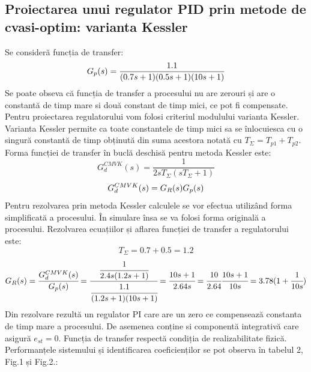 \documentclass[11pt]{article}
\newcommand{\EqRow}{\vspace{1.5mm}}
\begin{document}
\subsection{Proiectarea unui regulator PID prin metode de cvasi-optim: varianta Kessler}
Se consideră funcția de transfer:
\EqRow
\begin{equation}
G_p(s)=\frac{1.1}{(0.7s+1)(0.5s+1)(10s+1)}
\EqRow
\end{equation}
Se poate obseva că funcția de transfer a procesului nu are zerouri și are o  constantă de timp mare si două constant de timp mici, ce pot fi compensate. Pentru proiectarea regulatorului vom folosi criteriul modulului varianta Kessler. Varianta Kessler permite ca toate constantele de timp mici sa se înlocuiesca cu o singură constantă de timp obținută din suma acestora notată cu $T_{\Sigma}=T_{p1}+T_{p2}$.
Forma funcției de transfer în buclă deschisă pentru metoda Kessler este:
\vfill
\begin{equation} 
G_d^{CMVK}(s)=\frac{1}{2sT_{\Sigma}(sT_{\Sigma}+1)}
\end{equation}
\EqRow
\begin{equation} 
G_d^{CMVK}(s)=G_R(s)G_p(s)
\EqRow
\end{equation}
Pentru rezolvarea prin metoda Kessler calculele se vor efectua utilizând forma simplificată a procesului. În simulare însa se va folosi forma originală a procesului. Rezolvarea ecuațiilor și aflarea funcției de transfer a regulatorului este:
\vfill
$$T_{\Sigma}=0.7+0.5=1.2$$
\vfill
$$G_R(s)=\cfrac{G_d^{CMVK}(s)}{G_p(s)}=\cfrac{\cfrac{1}{2.4s(1.2s+1)}}{\cfrac{1.1}{(1.2s+1)(10s+1)}}=\cfrac{10s+1}{2.64s}=\cfrac{10}{2.64}\cfrac{10s+1}{10s}=3.78(1+\cfrac{1}{10s})\EqRow$$
Din rezolvare rezultă un regulator PI care are un zero ce compensează constanta de timp mare a procesului. De asemenea conține si componentă integrativă care asigură $e_{st}=0$. Funcția de transfer respectă condiția de realizabilitate fizică. Performanțele sistemului și identificarea coeficienților se pot observa în tabelul 2, Fig.1 și Fig.2.:
\end{document}
